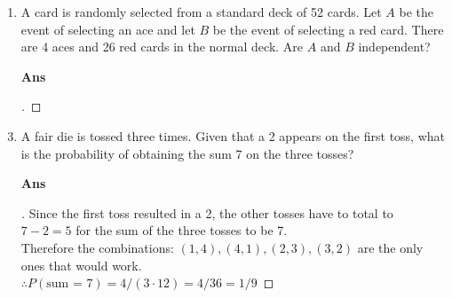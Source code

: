 \documentclass[paper=usletter, fontsize=12pt]{article}
\begin{document}
\begin{enumerate}
        \item  A card is randomly selected from a standard deck of 52 cards.
        Let $A$ be the event of selecting an ace and let $B$ be the event of
        selecting a red card. There are 4 aces and 26 red cards in the normal
        deck. Are $A$ and $B$ independent?
        \item[\textbf{Ans}]
        \begin{proof}[\unskip\nopunct]

        \end{proof}
        \vspace{0.2in}

        \item A fair die is tossed three times. Given that a 2 appears on the
        first toss, what is the probability of obtaining the sum 7 on the three
        tosses?
        \item[\textbf{Ans}]
        \begin{proof}[\unskip\nopunct]
            Since the first toss resulted in a 2, the other tosses have to
            total to $7 - 2 = 5$ for the sum of the three tosses to be 7. \\
            Therefore the combinations: $(1,4), (4, 1), (2,3), (3,2)$ are the
            only ones that would work. \\ $\therefore P(\text{sum = 7}) = 4/(3
            \cdot 12) = 4/36 = 1/9$ \qedhere
        \end{proof}
        \vspace{0.2in}


\end{enumerate}
\end{document}
